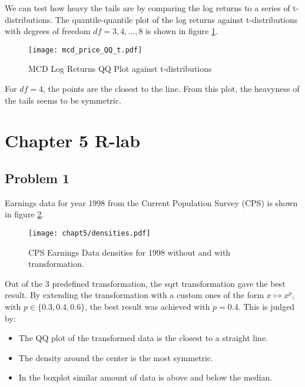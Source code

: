 \documentclass{article}
\begin{document}
We can test how heavy the tails are
by comparing the log returns to a series of t-distributions.
The quantile-quantile plot of the log returns
against t-distributions with degrees of freedom
$df=3, 4, \ldots, 8$ is shown in figure \ref{fig:mcd_qq_t}.
\begin{figure}[ht]
    \centering
    \texttt{[image: mcd\_price\_QQ\_t.pdf]}
    \caption{MCD Log Returns QQ Plot against t-distributions}
    \label{fig:mcd_qq_t}
\end{figure}
For $df=4$, the points are the closest to the line.
From this plot, the heavyness of the tails seems to be symmetric.

\section{Chapter 5 R-lab}
\subsection{Problem 1}
Earnings data for year 1998 from the Current Population Survey (CPS) is shown in figure \ref{fig:cps_earnings}.
\begin{figure}[ht]
    \centering
    \texttt{[image: chapt5/densities.pdf]}
    \caption{CPS Earnings Data densities for 1998 without and with transformation.}
    \label{fig:cps_earnings}
\end{figure}

Out of the 3 predefined transformation, the sqrt transformation gave the best result.
By extending the transformation with a custom ones of the form $x \mapsto x^p$,
with $p \in \{0.3, 0.4, 0.6\}$,
the best result was achieved with $p=0.4$. This is judged by:
\begin{itemize}
    \item The QQ plot of the transformed data is the closest to a straight line.
    \item The density around the center is the most symmetric.
    \item In the boxplot similar amount of data is above and below the median.
\end{itemize}
\end{document}
